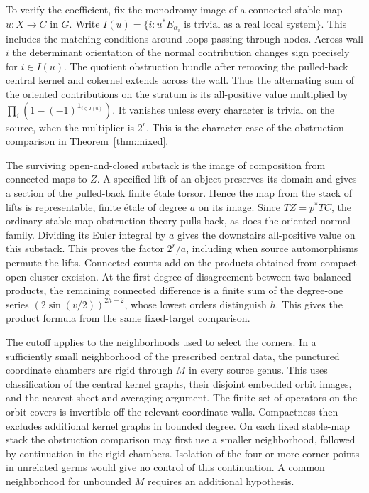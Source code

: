 To verify the coefficient, fix the monodromy image of a connected stable map \(u:X\to C\) in \(G\). Write \(I(u)=\{i:u^*E_{\alpha_i}\text{ is trivial as a real local system}\}\). This includes the matching conditions around loops passing through nodes. Across wall \(i\) the determinant orientation of the normal contribution changes sign precisely for \(i\in I(u)\). The quotient obstruction bundle after removing the pulled-back central kernel and cokernel extends across the wall. Thus the alternating sum of the oriented contributions on the stratum is its all-positive value multiplied by \(\prod_i(1-(-1)^{\mathbf 1_{i\in I(u)}})\). It vanishes unless every character is trivial on the source, when the multiplier is \(2^r\). This is the character case of the obstruction comparison in Theorem~\ref{thm:mixed}.

The surviving open-and-closed substack is the image of composition from connected maps to \(Z\). A specified lift of an object preserves its domain and gives a section of the pulled-back finite étale torsor. Hence the map from the stack of lifts is representable, finite étale of degree \(a\) on its image. Since \(TZ=p^*TC\), the ordinary stable-map obstruction theory pulls back, as does the oriented normal family. Dividing its Euler integral by \(a\) gives the downstairs all-positive value on this substack. This proves the factor \(2^r/a\), including when source automorphisms permute the lifts. Connected counts add on the products obtained from compact open cluster excision. At the first degree of disagreement between two balanced products, the remaining connected difference is a finite sum of the degree-one series \((2\sin(v/2))^{2h-2}\), whose lowest orders distinguish \(h\). This gives the product formula from the same fixed-target comparison.

The cutoff applies to the neighborhoods used to select the corners. In a sufficiently small neighborhood of the prescribed central data, the punctured coordinate chambers are rigid through \(M\) in every source genus. This uses classification of the central kernel graphs, their disjoint embedded orbit images, and the nearest-sheet and averaging argument. The finite set of operators on the orbit covers is invertible off the relevant coordinate walls. Compactness then excludes additional kernel graphs in bounded degree. On each fixed stable-map stack the obstruction comparison may first use a smaller neighborhood, followed by continuation in the rigid chambers. Isolation of the four or more corner points in unrelated germs would give no control of this continuation. A common neighborhood for unbounded \(M\) requires an additional hypothesis.

